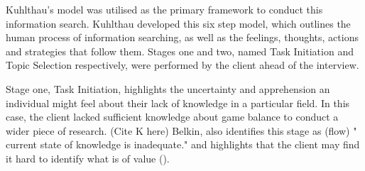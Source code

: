 Kuhlthau's model was utilised as the primary framework to conduct this information search. Kuhlthau developed this six step model, which outlines the human process of information searching, as well as the feelings, thoughts, actions and strategies that follow them. Stages one and two, named Task Initiation and Topic Selection respectively, were performed by the client ahead of the interview.

Stage one, Task Initiation, highlights the uncertainty and apprehension an individual might feel about their lack of knowledge in a particular field. In this case, the client lacked sufficient knowledge about game balance to conduct a wider piece of research.  (Cite K here) Belkin, also identifies this stage as (flow) " current state of knowledge is inadequate." and highlights that the client may find it hard to identify what is of value (\cite{belkin2000helping}).

